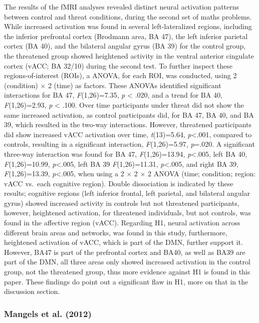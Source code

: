 \documentclass[
  stu]{apa7}
\begin{document}
The results of the fMRI analyses revealed distinct neural activation patterns between control and threat conditions, during the second set of maths problems.
While increased activation was found in several left-lateralized regions, including the inferior prefrontal cortex (Brodmann area, BA 47), the left inferior parietal cortex (BA 40), and the bilateral angular gyrus (BA 39) for the control group, the threatened group showed heightened activity in the ventral anterior cingulate cortex (vACC; BA 32/10) during the second test.
To further inspect these regions-of-interest (ROIs), a ANOVA, for each ROI, was conducted, using 2 (condition) \(\times\) 2 (time) as factors.
These ANOVAs identified significant interactions for BA 47, \emph{F}(1,26)=7.35, \emph{p} \textless{} .020, and a trend for BA 40, \emph{F}(1,26)=2.93, \emph{p} \textless{} .100.
Over time participants under threat did not show the same increased activation, as control participants did, for BA 47, BA 40, and BA 39, which resulted in the two-way interactions.
However, threatened participants did show increased vACC activation over time, \emph{t}(13)=5.64, \emph{p}\textless.001, compared to controls, resulting in a significant interaction, \emph{F}(1,26)=5.97, \emph{p}=.020.
A significant three-way interaction was found for BA 47, \emph{F}(1,26)=13.94, \emph{p}\textless.005, left BA 40, \emph{F}(1,26)=10.99, \emph{p}\textless.005, left BA 39 \emph{F}(1,26)=11.31, \emph{p}\textless.005, and right BA 39, \emph{F}(1,26)=13.39, \emph{p}\textless.005, when using a 2 \(\times\) 2 \(\times\) 2 ANOVA (time; condition; region: vACC vs.~each cognitive region).
Double dissociation is indicated by these results; cognitive regions (left inferior frontal, left parietal, and bilateral angular gyrus) showed increased activity in controls but not threatened participants, however, heightened activation, for threatened individuals, but not controls, was found in the affective region (vACC).
Regarding H1, neural activation across different brain areas and networks, was found in this study, furthermore, heightened activation of vACC, which is part of the DMN, further support it.
However, BA47 is part of the prefrontal cortex and BA40, as well as BA39 are part of the DMN, all three areas only showed increased activation in the control group, not the threatened group, thus more evidence against H1 is found in this paper.
These findings do point out a significant flaw in H1, more on that in the discussion section.

\subsubsection{Mangels et al. (2012)}\label{mangelsemotionblockspath2012}
\end{document}
